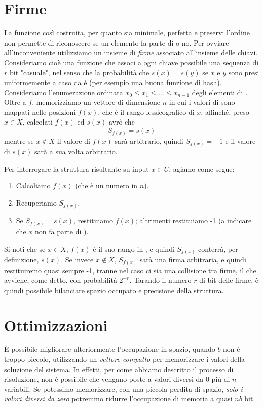 \section{Firme}
La funzione così costruita, per quanto sia minimale, perfetta e preservi l'ordine non permette di riconoscere se un elemento fa parte di  o no. Per ovviare all'inconveniente utilizziamo un insieme di \textit{firme} associato all'insieme  delle chiavi. Consideriamo cioè una funzione  che associ a ogni chiave possibile una sequenza di $r$ bit "casuale", nel senso che la probabilità che $s(x) = s(y)$ se $x$ e $y$ sono presi uniformemente a caso da  è  (per esempio una buona funzione di hash). Consideriamo l'enumerazione ordinata $x_0 \leq x_1 \leq \dots \leq x_{n - 1}$ degli elementi di . Oltre a $f$, memorizziamo
un vettore di dimensione $n$ in cui i valori di  sono mappati nelle posizioni $f(x)$, che è il rango lessicografico di $x$, affinché, preso $x \in X$, calcolati $f(x)$ ed $s(x)$ avrò che
\begin{equation}
	S_{f(x)} = s(x)
\end{equation}
mentre se $x \notin X$ il valore di $f(x)$ sarà arbitrario, quindi $S_{f(x)} = -1$ e il valore di $s(x)$ sarà a sua volta arbitrario.

Per interrogare la struttura risultante su input $x \in U$, agiamo come segue:
\begin{enumerate}
	\item Calcoliamo $f(x)$ (che è un numero in $n$).
	\item Recuperiamo $S_{f(x)}$.
	\item Se $S_{f(x)} = s(x)$, restituiamo $f(x)$; altrimenti restituiamo -1 (a indicare che $x$ non fa parte di ).
\end{enumerate}
Si noti che se $x \in X$, $f(x)$ è il suo rango in , e quindi $S_{f(x)}$ conterrà, per definizione, $s(x)$.
Se invece $x \notin X$, $S_{f(x)}$ sarà una firma arbitraria, e quindi restituiremo quasi sempre -1, tranne nel caso ci sia una collisione tra firme, il che avviene, come detto, con probabilità $2^{-r}$. Tarando il numero $r$ di bit delle firme, è quindi possibile bilanciare spazio occupato e precisione della struttura.

\section{Ottimizzazioni}
È possibile migliorare ulteriormente l'occupazione in spazio, quando $b$ non è troppo piccolo, utilizzando un \textit{vettore compatto} per memorizzare i valori della soluzione del sistema. In effetti, per come abbiamo descritto il processo di risoluzione, non è possibile che vengano poste a valori diversi da 0 più di $n$ variabili. Se potessimo memorizzare, con una piccola perdita di spazio, \textit{solo i valori diversi da zero} potremmo ridurre l'occupazione di memoria a quasi $nb$ bit.

